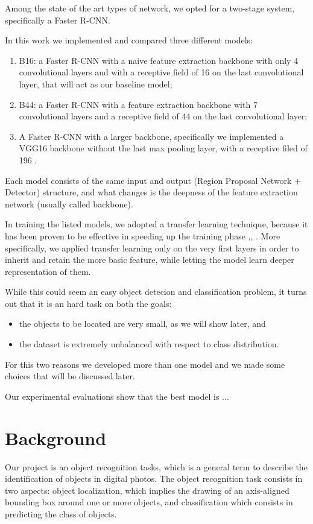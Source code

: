 \documentclass[a4paper,10pt]{report}
\begin{document}
Among the state of the art types of network, we opted for a two-stage system, specifically a Faster R-CNN.

In this work we implemented and compared three different models:
\begin{enumerate}
  \item B16: a Faster R-CNN with a naive feature extraction backbone with only 4 convolutional layers and with a receptive field of 16 on the last convolutional layer, that will act as our baseline model;
  \item B44: a Faster R-CNN with a feature extraction backbone with 7 convolutional layers and a receptive field of 44 on the last convolutional layer;
  \item A Faster R-CNN with a larger backbone, specifically we implemented a VGG16 backbone without the last max pooling layer, with a receptive filed of 196 \cite{vgg}.
\end{enumerate}
Each model consists of the same input and output (Region Proposal Network + Detector) structure, and what changes is the deepness of the feature extraction network (usually called backbone).

In training the listed models, we adopted a transfer learning technique, because it has been proven to be effective in speeding up the training phase \cite{claran},\cite{transfer-learning-1}, \cite{transfer-learning-2}.
More specifically, we applied transfer learning only on the very first layers in order to inherit and retain the more basic feature, while letting the model learn deeper representation of them.

While this could seem an easy object detecion and classification problem, it turns out that it is an hard task on both the goals:
\begin{itemize}
  \item the objects to be located are very small, as we will show later, and
  \item the dataset is extremely unbalanced with respect to class distribution.
\end{itemize}

For this two reasons we developed more than one model and we made some choices that will be discussed later.

Our experimental evaluations show that the best model is  ...

\chapter{Background}\label{chap:background}
Our project is an object recognition tasks, which is a general term to describe the identification of objects
in digital photos. 
The object recognition task consists in two aspects: object localization, which implies the drawing of an 
axis-aligned  bounding box around one or more objects, and classification which consists in predicting the class 
of objects.
\end{document}
